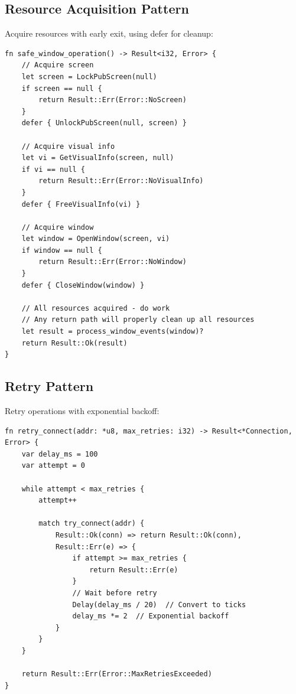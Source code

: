 \subsection{Resource Acquisition Pattern}

Acquire resources with early exit, using defer for cleanup:

\begin{lstlisting}
fn safe_window_operation() -> Result<i32, Error> {
    // Acquire screen
    let screen = LockPubScreen(null)
    if screen == null {
        return Result::Err(Error::NoScreen)
    }
    defer { UnlockPubScreen(null, screen) }

    // Acquire visual info
    let vi = GetVisualInfo(screen, null)
    if vi == null {
        return Result::Err(Error::NoVisualInfo)
    }
    defer { FreeVisualInfo(vi) }

    // Acquire window
    let window = OpenWindow(screen, vi)
    if window == null {
        return Result::Err(Error::NoWindow)
    }
    defer { CloseWindow(window) }

    // All resources acquired - do work
    // Any return path will properly clean up all resources
    let result = process_window_events(window)?
    return Result::Ok(result)
}
\end{lstlisting}

\subsection{Retry Pattern}

Retry operations with exponential backoff:

\begin{lstlisting}
fn retry_connect(addr: *u8, max_retries: i32) -> Result<*Connection, Error> {
    var delay_ms = 100
    var attempt = 0

    while attempt < max_retries {
        attempt++

        match try_connect(addr) {
            Result::Ok(conn) => return Result::Ok(conn),
            Result::Err(e) => {
                if attempt >= max_retries {
                    return Result::Err(e)
                }
                // Wait before retry
                Delay(delay_ms / 20)  // Convert to ticks
                delay_ms *= 2  // Exponential backoff
            }
        }
    }

    return Result::Err(Error::MaxRetriesExceeded)
}
\end{lstlisting}

